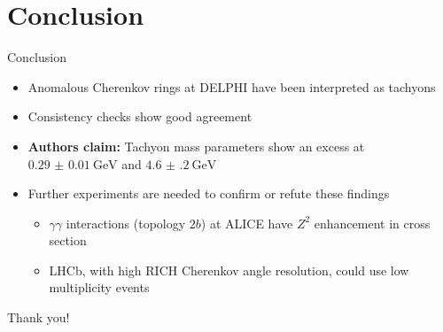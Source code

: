\documentclass{beamer}
\begin{document}
\section{Conclusion}
\begin{frame}{Conclusion}
  \begin{itemize}
    \setlength\itemsep{1.2em}
    \item{Anomalous Cherenkov rings at DELPHI have been interpreted as tachyons}
    \item{Consistency checks show good agreement}
    \item{\textbf{Authors claim:} Tachyon mass parameters show an excess at \underline{$\SI{0.29(1)}{\giga\eV}$} and \underline{$\SI{4.6(2)}{\giga\eV}$}}
    \item{Further experiments are needed to confirm or refute these findings}
    \begin{itemize}
      \item{$\gamma\gamma$ interactions (topology $2b$) at ALICE have $Z^2$ enhancement in cross section}
      \item{LHCb, with high RICH Cherenkov angle resolution, could use low multiplicity events}
    \end{itemize}
  \end{itemize}
  \begin{center}
    Thank you!
  \end{center}
\end{frame}
\end{document}
